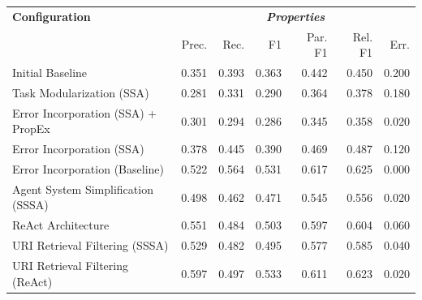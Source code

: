 \documentclass[a4paper,oneside,bibliography=totoc]{scrbook}
\begin{document}
\begin{table}[h]
  \centering
  \begin{tabular}{p{4cm}|rrrrrr}
    \toprule
    \textbf{Configuration}                       & \multicolumn{6}{c}{\textit{\textbf{Properties}}}                                                                                      \\
                                                 & Prec.                                            & Rec.           & F1             & Par. F1        & Rel. F1        & Err.           \\
    \midrule
    Initial Baseline                             & 0.351                                            & 0.393          & 0.363          & 0.442          & 0.450          & 0.200          \\
    Task Modularization (\ac{SSA})               & 0.281                                            & 0.331          & 0.290          & 0.364          & 0.378          & 0.180          \\
    Error Incorporation (\ac{SSA}) + \ac{PropEx} & 0.301                                            & 0.294          & 0.286          & 0.345          & 0.358          & 0.020          \\
    Error Incorporation (\ac{SSA})               & 0.378                                            & 0.445          & 0.390          & 0.469          & 0.487          & 0.120          \\
    Error Incorporation (Baseline)               & 0.522                                            & 0.564          & 0.531          & 0.617          & 0.625          & 0.000          \\
    Agent System Simplification (\ac{SSSA})      & 0.498                                            & 0.462          & 0.471          & 0.545          & 0.556          & 0.020          \\
    \ac{ReAct} Architecture                      & 0.551                                            & 0.484          & 0.503          & 0.597          & 0.604          & 0.060          \\
    \ac{URI} Retrieval Filtering (\ac{SSSA})     & 0.529                                            & 0.482          & 0.495          & 0.577          & 0.585          & 0.040          \\
    \ac{URI} Retrieval Filtering (\ac{ReAct})    & 0.597                                            & 0.497          & 0.533          & 0.611          & 0.623          & 0.020          \\

\end{tabular}
\end{table}
\end{document}
